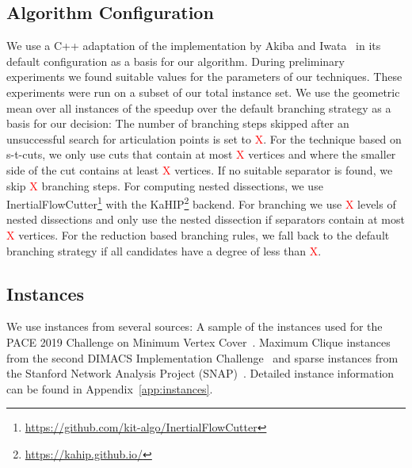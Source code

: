 \documentclass[a4paper,UKenglish,cleveref, autoref, thm-restate]{lipics-v2021}
\begin{document}
\subsection{Algorithm Configuration}
\label{sec:algo_conf}
We use a C++ adaptation of the implementation by Akiba and
Iwata~\cite{AkibaIwata} in its default configuration as a basis for our algorithm. During preliminary experiments we found
suitable values for the parameters of
our techniques. These experiments were run on a subset of our total instance
set. We use the geometric mean over all instances of the speedup over the
default branching strategy as a basis for our decision: The number of branching
steps skipped after an unsuccessful search for articulation points is set
to \textcolor{red}{X}. For the technique based on
s-t-cuts, we only use cuts that contain at most
\textcolor{red}{X} vertices and where the smaller side of
the cut contains at least \textcolor{red}{X} vertices.
If no suitable separator is found, we skip \textcolor{red}{X} branching steps. For computing nested dissections, we use 
InertialFlowCutter\footnote{\url{https://github.com/kit-algo/InertialFlowCutter}}
with the KaHIP\footnote{\url{https://kahip.github.io/}}
backend. For branching we use
\textcolor{red}{X} levels of nested dissections and
only use the nested dissection if separators contain at most
\textcolor{red}{X} vertices. For the reduction based
branching rules, we fall back to the default branching strategy if all
candidates have a degree of less than \textcolor{red}{X}.

\subsection{Instances}
We use instances from several sources: A sample of the instances used for the
PACE 2019 Challenge on Minimum Vertex Cover~\cite{dzulfikar_et_al:LIPIcs:2019:11486}. Maximum Clique instances from the second
DIMACS Implementation Challenge~\cite{johnson1993cliques} and sparse instances from
the Stanford Network Analysis Project (SNAP)~\cite{snapnets}. Detailed instance information can
be found in Appendix~\ref{app:instances}.
\end{document}
